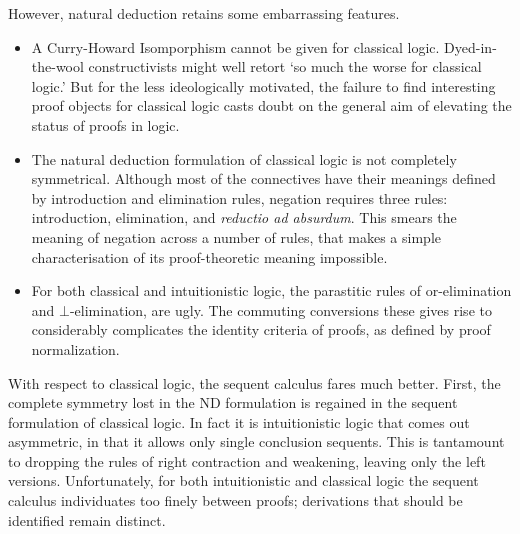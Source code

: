 However, natural deduction retains some embarrassing features.  
\begin{itemize}
\item A Curry-Howard Isomporphism cannot be given for classical
logic. Dyed-in-the-wool constructivists might well retort `so much the
worse for classical logic.'  But for the less ideologically motivated, the
failure to find interesting proof objects for classical logic casts doubt
on the general aim of elevating the status of proofs in logic.  
\item The natural deduction formulation of classical logic is not
completely symmetrical.  Although most of the connectives have their
meanings defined by introduction and elimination rules, negation requires
three rules: introduction, elimination, and {\it reductio ad absurdum}.
This smears the meaning of negation across a number of rules, that makes
a simple characterisation of its proof-theoretic meaning impossible.
\item For both classical and intuitionistic logic, the parastitic rules
of or-elimination and $\bot$-elimination, are ugly.  The commuting conversions
these gives rise to considerably complicates the identity criteria of
proofs, as defined by proof normalization.
\end{itemize}

With respect to classical logic, the sequent calculus fares much better.
First, the complete symmetry lost in the ND formulation is regained
in the sequent formulation of classical logic.  In fact it is intuitionistic
logic that comes out asymmetric, in that it allows only single
conclusion sequents.  This is tantamount to dropping the rules
of right contraction and weakening, leaving only the left versions.
Unfortunately, for both intuitionistic and classical logic the sequent calculus
individuates too finely between proofs; derivations that should be
identified remain distinct.

